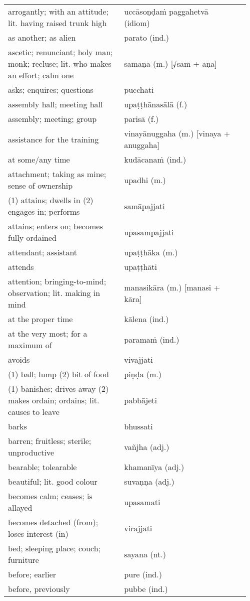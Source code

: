 \documentclass[a5paper]{memoir}
\begin{document}
\begin{longtable}{L{0.48\linewidth} L{0.48\linewidth} H}
arrogantly; with an attitude; lit. having raised trunk high & uccāsoṇḍaṁ paggahetvā (idiom) & \\
as another; as alien & parato (ind.) & \\
ascetic; renunciant; holy man; monk; recluse; lit. who makes an effort; calm one & samaṇa (m.) [√sam + aṇa] & \\
asks; enquires; questions & pucchati & \\
assembly hall; meeting hall & upaṭṭhānasālā (f.) & \\
assembly; meeting; group & parisā (f.) & \\
assistance for the training & vinayānuggaha (m.) [vinaya + anuggaha] & \\
at some/any time & kudācanaṁ (ind.) & \\
attachment; taking as mine; sense of ownership & upadhi (m.) & \\
(1) attains; dwells in (2) engages in; performs & samāpajjati & \\
attains; enters on; becomes fully ordained & upasampajjati & \\
attendant; assistant & upaṭṭhāka (m.) & \\
attends & upaṭṭhāti & \\
attention; bringing-to-mind; observation; lit. making in mind & manasikāra (m.) [manasi + kāra] & \\
at the proper time & kālena (ind.) & \\
at the very most; for a maximum of & paramaṁ (ind.) & \\
avoids & vivajjati & \\
(1) ball; lump (2) bit of food & piṇḍa (m.) & \\
(1) banishes; drives away (2) makes ordain; ordains; lit. causes to leave & pabbājeti & \\
barks & bhussati & \\
barren; fruitless; sterile; unproductive & vañjha (adj.) & \\
bearable; tolearable & khamanīya (adj.) & \\
beautiful; lit. good colour & suvaṇṇa (adj.) & \\
becomes calm; ceases; is allayed & upasamati & \\
becomes detached (from); loses interest (in) & virajjati & \\
bed; sleeping place; couch; furniture & sayana (nt.) & \\
before; earlier & pure (ind.) & \\
before, previously & pubbe (ind.) & \\

\end{longtable}
\end{document}
